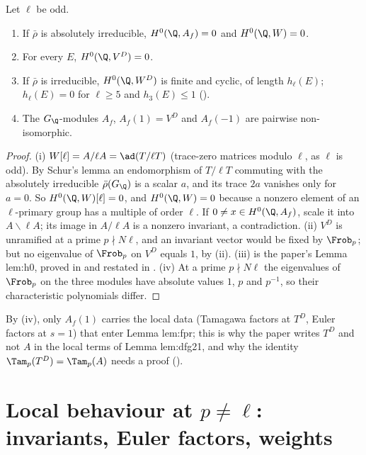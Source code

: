 \begin{proposition}\label{prop:blochkato:global-invariants}
Let $\ell$ be odd.
\begin{enumerate}[label=(\roman*)]
\item If $\bar\rho$ is absolutely irreducible, $H^0(\Q,A_f)=0$ and $H^0(\Q,W)=0$.
\item For every $E$, $H^0(\Q,V^D)=0$.
\item If $\bar\rho$ is irreducible, $H^0(\Q,W^D)$ is finite and cyclic, of length $h_\ell(E)$; $h_\ell(E)=0$ for $\ell\ge5$ and $h_3(E)\le1$
().
\item The $G_\Q$-modules $A_f$, $A_f(1)=V^D$ and $A_f(-1)$ are pairwise non-isomorphic.
\end{enumerate}
\end{proposition}

\begin{proof}
(i) $W[\ell]=A/\ell A=\ad(T/\ell T)$ (trace-zero matrices modulo $\ell$, as $\ell$ is odd). By Schur's lemma an endomorphism of $T/\ell T$ commuting with the
absolutely irreducible $\bar\rho(G_\Q)$ is a scalar $a$, and its trace $2a$ vanishes only for $a=0$. So $H^0(\Q,W)[\ell]=0$, and $H^0(\Q,W)=0$ because a nonzero
element of an $\ell$-primary group has a multiple of order $\ell$. If $0\ne x\in H^0(\Q,A_f)$, scale it into $A\smallsetminus\ell A$; its image in $A/\ell A$ is a nonzero
invariant, a contradiction. (ii) $V^D$ is unramified at a prime $p\nmid N\ell$, and an invariant vector would be fixed by $\Frob_p$; but no eigenvalue of $\Frob_p$ on
$V^D$ equals $1$, by (ii). (iii) is the paper's Lemma lem:h0, proved in  and restated in
. (iv) At a prime $p\nmid N\ell$ the eigenvalues of $\Frob_p$ on the three modules have absolute values $1$, $p$ and $p^{-1}$, so their
characteristic polynomials differ.
\end{proof}

By (iv), only $A_f(1)$ carries the local data (Tamagawa factors at $T^D$, Euler factors at $s=1$) that enter Lemma lem:fpr; this is why
the paper writes $T^D$ and not $A$ in the local terms of Lemma lem:dfg21, and why the identity $\Tam_p(T^D)=\Tam_p(A)$ needs a proof
().

\section[Local behaviour at \texorpdfstring{$p\ne\ell$}{p not l}]{Local behaviour at \texorpdfstring{$p\ne\ell$}{p not l}: invariants, Euler factors, weights}\label{sec:blochkato:local}


